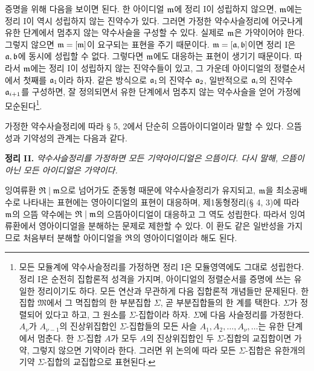 증명을 위해 다음을 보이면 된다. 한 아이디얼 \(\mathfrak{m}\)에 정리 I이 성립하지 않으면, \(\mathfrak{m}\)에는 정리 I이 역시 성립하지 않는 진약수가 있다. 그러면 가정한 약수사슬정리에 어긋나게 유한 단계에서 멈추지 않는 약수사슬을 구성할 수 있다. 실제로 \(\mathfrak{m}\)은 가약이어야 한다. 그렇지 않으면 \(\mathfrak{m}=[\mathfrak{m}]\)이 요구되는 표현을 주기 때문이다. \(\mathfrak{m}=[\mathfrak{a},\mathfrak{b}]\)이면 정리 I은 \(\mathfrak{a},\mathfrak{b}\)에 동시에 성립할 수 없다. 그렇다면 \(\mathfrak{m}\)에도 대응하는 표현이 생기기 때문이다. 따라서 \(\mathfrak{m}\)에는 정리 I이 성립하지 않는 진약수들이 있고, 그 가운데 아이디얼의 정렬순서에서 첫째를 \(\mathfrak{a}_1\)이라 하자. 같은 방식으로 \(\mathfrak{a}_1\)의 진약수 \(\mathfrak{a}_2\), 일반적으로 \(\mathfrak{a}_i\)의 진약수 \(\mathfrak{a}_{i+1}\)를 구성하면, 잘 정의되면서 유한 단계에서 멈추지 않는 약수사슬을 얻어 가정에 모순된다\footnote{모든 모듈계에 약수사슬정리를 가정하면 정리 I은 모듈영역에도 그대로 성립한다. 정리 I은 순전히 집합론적 성격을 가지며, 아이디얼의 정렬순서를 증명에 쓰는 유일한 정리이기도 하다. 모든 연산과 무관하게 다음 집합론적 개념들만 문제된다. 한 집합 \(\mathfrak M\)에서 그 멱집합의 한 부분집합 \(\Sigma\), 곧 부분집합들의 한 계를 택한다. \(\Sigma\)가 정렬되어 있다고 하고, 그 원소를 \(\Sigma\)-집합이라 하자. \(\Sigma\)에 다음 사슬정리를 가정한다. \(A_\nu\)가 \(A_{\nu-1}\)의 진상위집합인 \(\Sigma\)-집합들의 모든 사슬 \(A_1,A_2,\ldots,A_\nu,\ldots\)는 유한 단계에서 멈춘다. 한 \(\Sigma\)-집합 \(A\)가 모두 \(A\)의 진상위집합인 두 \(\Sigma\)-집합의 교집합이면 가약, 그렇지 않으면 기약이라 한다. 그러면 위 논의에 따라 모든 \(\Sigma\)-집합은 유한개의 기약 \(\Sigma\)-집합의 교집합으로 표현된다.}.

가정한 약수사슬정리에 따라 § 5, 2에서 단순히 으뜸아이디얼이라 말할 수 있다. 으뜸성과 기약성의 관계는 다음과 같다.

\textbf{정리 II.} \emph{약수사슬정리를 가정하면 모든 기약아이디얼은 으뜸이다. 다시 말해, 으뜸이 아닌 모든 아이디얼은 가약이다.}

잉여류환 \(\mathfrak{R}\mid\mathfrak{m}\)으로 넘어가도 준동형 때문에 약수사슬정리가 유지되고, \(\mathfrak{m}\)을 최소공배수로 나타내는 표현에는 영아이디얼의 표현이 대응하며, 제1동형정리(§ 4, 3)에 따라 \(\mathfrak{m}\)의 으뜸 약수에는 \(\mathfrak{R}\mid\mathfrak{m}\)의 으뜸아이디얼이 대응하고 그 역도 성립한다. 따라서 잉여류환에서 영아이디얼을 분해하는 문제로 제한할 수 있다. 이 환도 같은 일반성을 가지므로 처음부터 분해할 아이디얼을 \(\mathfrak{R}\)의 영아이디얼이라 해도 된다.

